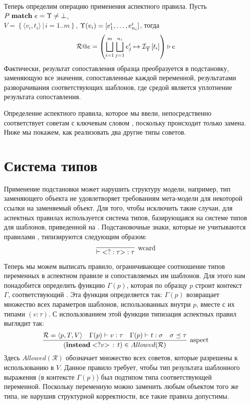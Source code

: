 Теперь определим операцию применения аспектного правила.
Пусть $P \; \mathbf{match}_{} \; e = \Upsilon \neq \bot$, \\$V = \left\{\langle v_i, t_i \rangle \,|\, i = 1..m \right\}$,  $\Upsilon(v_i) = [e^i_1, \ldots, e^i_{n_i}]$, тогда
	$$\mathcal{R}@e
		= \left( \bigsqcup\limits_{i=1}^{m} \bigsqcup\limits_{j=1}^{n_i}
			e^i_j \mapsto \mathcal{I}_{\overline{\Upsilon}} \left[ t_i \right] \right) \triangleright e$$
Фактически, результат сопоставления образца преобразуется в подстановку, заменяющую все значения, сопоставленные каждой переменной, результатами разворачивания соответствующих шаблонов, где средой является уплотнение результата сопоставления.

\begin{Note}
Определение аспектного правила, которое мы ввели, непосредственно соответствует советам с ключевым словом , поскольку происходит только замена. Ниже мы покажем, как реализовать два другие типы советов.
\end{Note}


\section{Система типов}

Применение подстановки может нарушить структуру модели, например, тип заменяющего объекта не удовлетворяет требованиям мета-модели для некоторой ссылки на заменяемый объект. Для того, чтобы исключить такие случаи, для аспектных правилах используется система типов, базирующаяся на системе типов для шаблонов, приведенной на .  Подстановочные знаки, которые не учитываются правилами , типизируются следующим образом:
$$
	\myinfer[wcard]{ \vdash \wcard{?}{\tau} : \tau}{}
$$

Теперь мы можем выписать правило, ограничивающее соотношение типов переменных в аспектном правиле и сопоставляемых им шаблонов. Для этого нам понадобится определить функцию $\Gamma(p)$, которая по образцу $p$ строит контекст $\Gamma$, соответствующий . Эта функция определяется так: $\Gamma(p)$ возвращает множество всех параметров шаблонов, использованных внутри $p$, вместе с их типами $(v : \tau)$. С использованием этой функции типизация аспектных правил выглядит так:
$$
	\myinfer[aspect]{
		(\mathbf{instead} \; \ang{?v} \, : \, t) \in Allowed(\mathcal{R})
	}{
		\mathcal{R} = \langle p, T, V \rangle &
		\Gamma(p) \vdash v : \tau &
		\Gamma(p) \vdash t : \sigma &
		\sigma \preceq \tau
	}
$$
Здесь $Allowed(\mathcal{R})$ обозначает множество всех советов, которые разрешены к использованию в $V$. Данное правило требует, чтобы тип результата шаблонного выражения (в контексте $\Gamma(p)$) был подтипом типа соответствующей переменной. Поскольку переменную можно заменить любым объектом того же типа, не нарушив структурной корректности, все такие правила допустимы.

